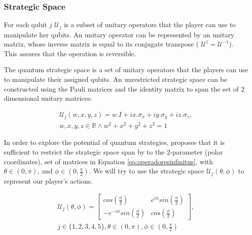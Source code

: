\documentclass[10pt]{llncs}
\begin{document}
\subsubsection{Strategic Space}
\label{subsec:strategic_space}

For each qubit $j$ $\mathcal{U}_{j}$ is a subset of unitary operators that the player can use to manipulate her qubits. An unitary operator can be represented by an unitary matrix, whose inverse matrix is equal to its conjugate transpose ( $\mathcal{U}^{\dagger}=\mathcal{U}^{-1}$). This assures that the operation is reversible.

The quantum strategic space is a set of unitary operators that the players can use to manipulate their assigned qubits. An unrestricted strategic space can be constructed using the Pauli matrices and the identity matrix to span the set of $2$ dimensional unitary matrices:

\begin{equation} 
\begin{split}
\mathcal{U}_{j}(w,x,y,z)=w.I + ix.\sigma_{x} + iy.\sigma_{y} + iz.\sigma_{z} , \\   w,x,y,z \in \mathbb{R} \wedge  
w^2 + x^2 + y^2 + z^2 =1 
\end{split}
\end{equation}



In  order to explore the potential of quantum strategies, \cite{Eisert2008} proposes that it is sufficient to restrict the strategic space span by to the $2$-parameter (polar coordinates), set of matrices in Equation \eqref{eq:operadoresinfinitus}, with $ \theta \in ( 0, \pi )$, and $\phi \in ( 0, \frac{\pi}{2})$. We will try to use the strategic space $\mathcal{U}_{j}(\theta,\phi)$ to represent our player's actions.



\begin{equation}
\begin{split}
\mathcal{U}_{j}(\theta,\phi) = \left[\begin{array}{cc}
cos(\frac{\phi}{2}) & e^{i\phi}sin(\frac{\phi}{2})\\
-e^{-i\phi}sin(\frac{\phi}{2}) & cos(\frac{\phi}{2})
\end{array}\right] , \\  j \in \{ 1, 2, 3, 4, 5 \}, \theta \in ( 0, \pi ) , \phi \in ( 0, \frac{\pi}{2})
\end{split}
\label{eq:operadoresinfinitus}
\end{equation}
\end{document}
